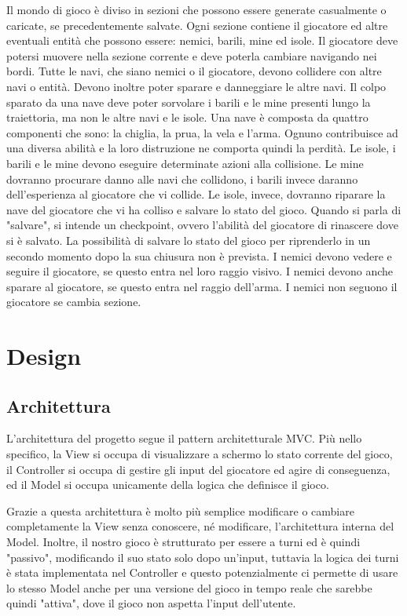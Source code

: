 \documentclass[a4paper,12pt]{report}
\begin{document}
Il mondo di gioco è diviso in sezioni che possono essere generate casualmente o caricate, se precedentemente salvate.
%
Ogni sezione contiene il giocatore ed altre eventuali entità che possono essere: nemici, barili, mine ed isole.
%
Il giocatore deve potersi muovere nella sezione corrente e deve poterla cambiare navigando nei bordi.
%
Tutte le navi, che siano nemici o il giocatore, devono collidere con altre navi o entità.
%
Devono inoltre poter sparare e danneggiare le altre navi.
%
Il colpo sparato da una nave deve poter sorvolare i barili e le mine presenti lungo la traiettoria, ma non le altre navi e le isole.
%
Una nave è composta da quattro componenti che sono: la chiglia, la prua, la vela e l'arma.
%
Ognuno contribuisce ad una diversa abilità e la loro distruzione ne comporta quindi la perdità.
%
Le isole, i barili e le mine devono eseguire determinate azioni alla collisione.
%
Le mine dovranno procurare danno alle navi che collidono, i barili invece daranno dell'esperienza al giocatore che vi collide.
%
Le isole, invece, dovranno riparare la nave del giocatore che vi ha colliso e salvare lo stato del gioco.
%
Quando si parla di "salvare", si intende un checkpoint, ovvero l'abilità del giocatore di rinascere dove si è salvato.
%
La possibilità di salvare lo stato del gioco per riprenderlo in un secondo momento dopo la sua chiusura non è prevista.
%
I nemici devono vedere e seguire il giocatore, se questo entra nel loro raggio visivo.
%
I nemici devono anche sparare al giocatore, se questo entra nel raggio dell'arma.
%
I nemici non seguono il giocatore se cambia sezione.

\chapter{Design}

\section{Architettura}

L'architettura del progetto segue il pattern architetturale MVC.
%
Più nello specifico, la View si occupa di visualizzare a schermo lo stato corrente del gioco,
il Controller si occupa di gestire gli input del giocatore ed agire di conseguenza, ed
il Model si occupa unicamente della logica che definisce il gioco.

Grazie a questa architettura è molto più semplice modificare o cambiare completamente la View
senza conoscere, né modificare, l'architettura interna del Model.
%
Inoltre, il nostro gioco è strutturato per essere a turni ed è quindi "passivo", modificando il suo stato solo dopo un'input,
tuttavia la logica dei turni è stata implementata nel Controller e questo potenzialmente ci permette di usare lo stesso Model
anche per una versione del gioco in tempo reale che sarebbe quindi "attiva", dove il gioco non aspetta l'input dell'utente.
\end{document}
